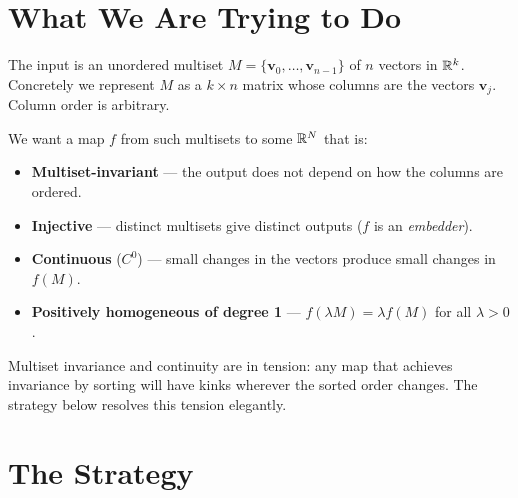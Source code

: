 %
%
\section{What We Are Trying to Do}
\label{sec:goals}

The input is an unordered multiset $M = \{\mathbf{v}_0,\ldots,\mathbf{v}_{n-1}\}$
of $n$ vectors in $\mathbb{R}^k$.  Concretely we represent $M$ as a $k\times n$ matrix
whose columns are the vectors $\mathbf{v}_j$.  Column order is arbitrary.

We want a map $f$ from such multisets to some $\mathbb{R}^N$ that is:
\begin{itemize}[nosep]
  \item \textbf{Multiset-invariant} — the output does not depend on how the
        columns are ordered.
  \item \textbf{Injective} — distinct multisets give distinct outputs ($f$ is
        an \emph{embedder}).
  \item \textbf{Continuous} ($C^0$) — small changes in the vectors produce
        small changes in $f(M)$.
  \item \textbf{Positively homogeneous of degree 1} — $f(\lambda M) =
        \lambda f(M)$ for all $\lambda > 0$.
\end{itemize}

Multiset invariance and continuity are in tension: any map that achieves
invariance by sorting will have kinks wherever the sorted order changes.
The strategy below resolves this tension elegantly.

\section{The Strategy}
\label{sec:strategy}


